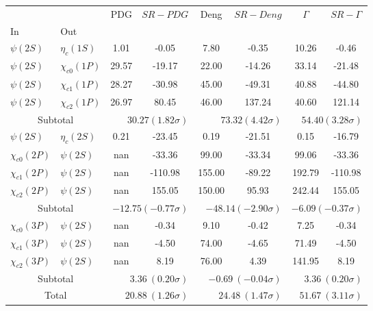 \begin{tabular}{|l|l|c|c|c|c|c|c|}%
\hline%
&&PDG&$SR-PDG$&Deng&$SR-Deng$&$\Gamma$&$SR-\Gamma$\\%
In&Out&&&&&&\\%
\hline%
$\psi(2S)$&$\eta_{c}(1S)$&1.01&-0.05&7.80&-0.35&10.26&-0.46\\%
$\psi(2S)$&$\chi_{c0}(1P)$&29.57&-19.17&22.00&-14.26&33.14&-21.48\\%
$\psi(2S)$&$\chi_{c1}(1P)$&28.27&-30.98&45.00&-49.31&40.88&-44.80\\%
$\psi(2S)$&$\chi_{c2}(1P)$&26.97&80.45&46.00&137.24&40.60&121.14\\%
\hline%
\hline%
\multicolumn{2}{|c|}{Subtotal}&\multicolumn{2}{|r|}{$30.27 (1.82\sigma)$}&\multicolumn{2}{|r|}{$73.32 (4.42\sigma)$}&\multicolumn{2}{|r|}{$54.40 (3.28\sigma)$}\\%
\hline%
\hline%
$\psi(2S)$&$\eta_{c}(2S)$&0.21&-23.45&0.19&-21.51&0.15&-16.79\\%
$\chi_{c0}(2P)$&$\psi(2S)$&nan&-33.36&99.00&-33.34&99.06&-33.36\\%
$\chi_{c1}(2P)$&$\psi(2S)$&nan&-110.98&155.00&-89.22&192.79&-110.98\\%
$\chi_{c2}(2P)$&$\psi(2S)$&nan&155.05&150.00&95.93&242.44&155.05\\%
\hline%
\hline%
\multicolumn{2}{|c|}{Subtotal}&\multicolumn{2}{|r|}{$-12.75 (-0.77\sigma)$}&\multicolumn{2}{|r|}{$-48.14 (-2.90\sigma)$}&\multicolumn{2}{|r|}{$-6.09 (-0.37\sigma)$}\\%
\hline%
\hline%
$\chi_{c0}(3P)$&$\psi(2S)$&nan&-0.34&9.10&-0.42&7.25&-0.34\\%
$\chi_{c1}(3P)$&$\psi(2S)$&nan&-4.50&74.00&-4.65&71.49&-4.50\\%
$\chi_{c2}(3P)$&$\psi(2S)$&nan&8.19&76.00&4.39&141.95&8.19\\%
\hline%
\hline%
\multicolumn{2}{|c|}{Subtotal}&\multicolumn{2}{|r|}{$3.36~(0.20\sigma)$}&\multicolumn{2}{|r|}{$-0.69~(-0.04\sigma)$}&\multicolumn{2}{|r|}{$3.36~(0.20\sigma)$}\\%
\hline%
\hline%
\multicolumn{2}{|c|}{Total}&\multicolumn{2}{|r|}{$20.88~(1.26\sigma)$}&\multicolumn{2}{|r|}{$24.48~(1.47\sigma)$}&\multicolumn{2}{|r|}{$51.67~(3.11\sigma)$}\\%
\hline%
\end{tabular}